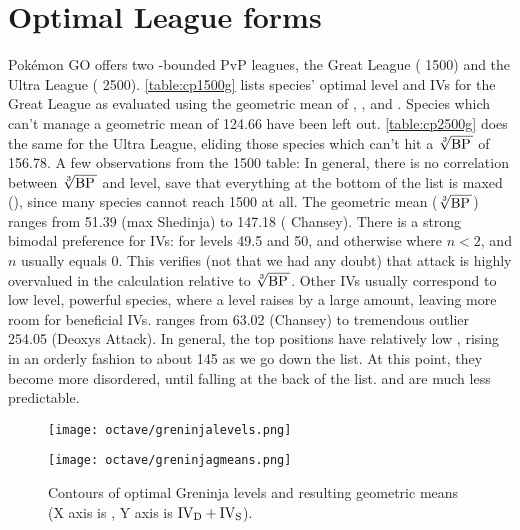 \section{Optimal League forms}
Pokémon GO offers two \CP{}-bounded PvP leagues, the Great League (\CP{} 1500) and
   the Ultra League (\CP{} 2500).
\autoref{table:cp1500g} lists species' optimal level and IVs for the Great League
  as evaluated using the geometric mean of , , and \MHP{}.
Species which can't manage a geometric mean of 124.66 have been left out.
\autoref{table:cp2500g} does the same for the Ultra League, eliding those species which
  can't hit a $\sqrt[3]{\mbox{BP}\,}$ of 156.78.
A few observations from the \CP{}1500 table:
In general, there is no correlation between $\sqrt[3]{\mbox{BP}\,}$ and level,
  save that everything at the bottom of the list is maxed (),
  since many species cannot reach 1500 \CP{} at all.
The geometric mean ($\sqrt[3]{\mbox{BP}\,}$) ranges from 51.39 (max Shedinja)
  to 147.18 ( Chansey).
There is a strong bimodal preference for IVs:  for levels 49.5
  and 50, and otherwise  where $n < 2$, and $n$ usually equals 0.
This verifies (not that we had any doubt) that attack is highly overvalued in the \CP{} calculation relative to $\sqrt[3]{\mbox{BP}\,}$.
Other IVs usually correspond to low level, powerful species, where a level
  raises \CP{} by a large amount, leaving more room for beneficial IVs.
 ranges from 63.02 (Chansey) to tremendous outlier 254.05 (Deoxys Attack).
In general, the top positions have relatively low , rising in an
  orderly fashion to about 145 as we go down the list.
At this point, they become more disordered, until falling at the back
  of the list.
\MHP{} and  are much less predictable.
\begin{figure}
\begin{minipage}{0.5\textwidth}\begin{center}
\texttt{[image: octave/greninjalevels.png]}
\end{center}\end{minipage}%
\begin{minipage}{0.5\textwidth}\begin{center}
\texttt{[image: octave/greninjagmeans.png]}
\end{center}\end{minipage}%
\caption[Contours of optimal Greninja levels]{Contours of optimal Greninja levels and resulting geometric means
  (X axis is , Y axis is $\mbox{$\text{IV}_\text{D}$} + \mbox{$\text{IV}_\text{S}$}$).\label{fig:contours}}
\end{figure}

